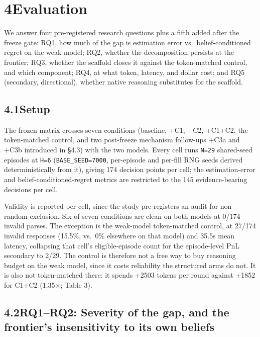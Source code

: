 \documentclass[
  10pt,
]{article}
\begin{document}
\section{4\quad Evaluation}\label{evaluation}

We answer four pre-registered research questions plus a fifth added after the freeze gate: RQ1, how much of the gap is estimation error vs.~belief-conditioned regret on the weak model; RQ2, whether the decomposition persists at the frontier; RQ3, whether the scaffold closes it against the token-matched control, and which component; RQ4, at what token, latency, and dollar cost; and RQ5 (secondary, directional), whether native reasoning substitutes for the scaffold.

\subsection{4.1\quad Setup}\label{setup}

The frozen matrix crosses seven conditions (baseline, +C1, +C2, +C1+C2, the token-matched control, and two post-freeze mechanism follow-ups +C3a and +C3b introduced in §4.3) with the two models. Every cell runs \texttt{N=29} shared-seed episodes at \texttt{H=6} (\texttt{BASE\_SEED=7000}, per-episode and per-fill RNG seeds derived deterministically from it), giving 174 decision points per cell; the estimation-error and belief-conditioned-regret metrics are restricted to the 145 evidence-bearing decisions per cell.

Validity is reported per cell, since the study pre-registers an audit for non-random exclusion. Six of seven conditions are clean on both models at 0/174 invalid parses. The exception is the weak-model token-matched control, at 27/174 invalid responses (15.5\%, vs.~0\% elsewhere on that model) and 35.5s mean latency, collapsing that cell's eligible-episode count for the episode-level PnL secondary to 2/29. The control is therefore not a free way to buy reasoning budget on the weak model, since it costs reliability the structured arms do not. It is also not token-matched there: it spends +2503 tokens per round against +1852 for C1+C2 (1.35×; Table 3).

\subsection{4.2\quad RQ1--RQ2: Severity of the gap, and the frontier's insensitivity to its own beliefs}\label{rq1rq2-severity-of-the-gap-and-the-frontiers-insensitivity-to-its-own-beliefs}
\end{document}
